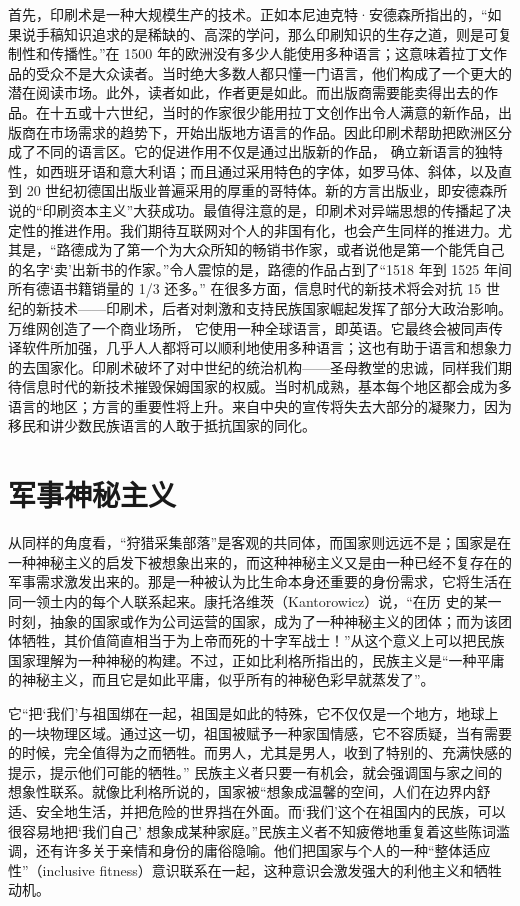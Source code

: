 首先，印刷术是一种大规模生产的技术。正如本尼迪克特·安德森所指出的，“如果说手稿知识追求的是稀缺的、高深的学问，那么印刷知识的生存之道，则是可复制性和传播性。”在 1500 年的欧洲没有多少人能使用多种语言；这意味着拉丁文作品的受众不是大众读者。当时绝大多数人都只懂一门语言，他们构成了一个更大的潜在阅读市场。此外，读者如此，作者更是如此。而出版商需要能卖得出去的作品。在十五或十六世纪，当时的作家很少能用拉丁文创作出令人满意的新作品，出版商在市场需求的趋势下，开始出版地方语言的作品。因此印刷术帮助把欧洲区分成了不同的语言区。它的促进作用不仅是通过出版新的作品， 确立新语言的独特性，如西班牙语和意大利语；而且通过采用特色的字体，如罗马体、斜体，以及直到 20 世纪初德国出版业普遍采用的厚重的哥特体。新的方言出版业，即安德森所说的“印刷资本主义”大获成功。最值得注意的是，印刷术对异端思想的传播起了决定性的推进作用。我们期待互联网对个人的非国有化，也会产生同样的推进力。尤其是，“路德成为了第一个为大众所知的畅销书作家，或者说他是第一个能凭自己的名字‘卖’出新书的作家。”令人震惊的是，路德的作品占到了“1518 年到 1525 年间所有德语书籍销量的 1/3 还多。” 在很多方面，信息时代的新技术将会对抗 15 世纪的新技术——印刷术，后者对刺激和支持民族国家崛起发挥了部分大政治影响。万维网创造了一个商业场所， 它使用一种全球语言，即英语。它最终会被同声传译软件所加强，几乎人人都将可以顺利地使用多种语言；这也有助于语言和想象力的去国家化。印刷术破坏了对中世纪的统治机构——圣母教堂的忠诚，同样我们期待信息时代的新技术摧毁保姆国家的权威。当时机成熟，基本每个地区都会成为多语言的地区；方言的重要性将上升。来自中央的宣传将失去大部分的凝聚力，因为移民和讲少数民族语言的人敢于抵抗国家的同化。

\section{军事神秘主义}
从同样的角度看，“狩猎采集部落”是客观的共同体，而国家则远远不是；国家是在一种神秘主义的启发下被想象出来的，而这种神秘主义又是由一种已经不复存在的军事需求激发出来的。那是一种被认为比生命本身还重要的身份需求，它将生活在同一领土内的每个人联系起来。康托洛维茨（Kantorowicz）说，“在历 史的某一时刻，抽象的国家或作为公司运营的国家，成为了一种神秘主义的团体；而为该团体牺牲，其价值简直相当于为上帝而死的十字军战士！”从这个意义上可以把民族国家理解为一种神秘的构建。不过，正如比利格所指出的，民族主义是“一种平庸的神秘主义，而且它是如此平庸，似乎所有的神秘色彩早就蒸发了”。

它“把‘我们’与祖国绑在一起，祖国是如此的特殊，它不仅仅是一个地方，地球上的一块物理区域。通过这一切，祖国被赋予一种家国情感，它不容质疑，当有需要的时候，完全值得为之而牺牲。而男人，尤其是男人，收到了特别的、充满快感的提示，提示他们可能的牺牲。” 民族主义者只要一有机会，就会强调国与家之间的想象性联系。就像比利格所说的，国家被“想象成温馨的空间，人们在边界内舒适、安全地生活，并把危险的世界挡在外面。而‘我们’这个在祖国内的民族，可以很容易地把‘我们自己’ 想象成某种家庭。”民族主义者不知疲倦地重复着这些陈词滥调，还有许多关于亲情和身份的庸俗隐喻。他们把国家与个人的一种“整体适应性”（inclusive fitness）意识联系在一起，这种意识会激发强大的利他主义和牺牲动机。



